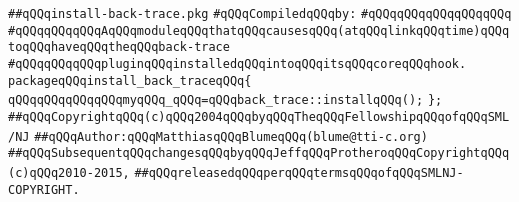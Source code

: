 \label{src/app/debug/install-back-trace.pkg}
\verb|##qQQqinstall-back-trace.pkg|\newline
\newline
\verb|#qQQqCompiledqQQqby:|\newline
\verb|#qQQqqQQqqQQqqQQqqQQq|\newline
\newline
\verb|#qQQqqQQqqQQqAqQQqmoduleqQQqthatqQQqcausesqQQq(atqQQqlinkqQQqtime)qQQqtoqQQqhaveqQQqtheqQQqback-trace|\newline
\verb|#qQQqqQQqqQQqpluginqQQqinstalledqQQqintoqQQqitsqQQqcoreqQQqhook.|\newline
\newline
\verb|packageqQQqinstall_back_traceqQQq{|\newline
\verb|qQQqqQQqqQQqqQQqmyqQQq_qQQq=qQQqback_trace::installqQQq();|\newline
\verb|};|\newline
\newline
\newline
\verb|##qQQqCopyrightqQQq(c)qQQq2004qQQqbyqQQqTheqQQqFellowshipqQQqofqQQqSML/NJ|\newline
\verb|##qQQqAuthor:qQQqMatthiasqQQqBlumeqQQq(blume@tti-c.org)|\newline
\verb|##qQQqSubsequentqQQqchangesqQQqbyqQQqJeffqQQqProtheroqQQqCopyrightqQQq(c)qQQq2010-2015,|\newline
\verb|##qQQqreleasedqQQqperqQQqtermsqQQqofqQQqSMLNJ-COPYRIGHT.|\newline

